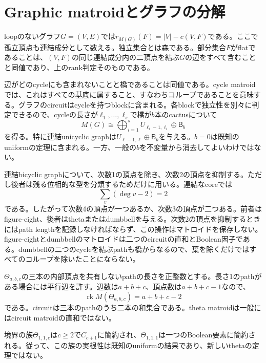 \documentclass[12pt]{amsart}
\theoremstyle{definition}
\theoremstyle{remark}
\numberwithin{equation}{section}
\newcommand{\rk}{\operatorname{rk}}
\newcommand{\Bmat}{\mathsf{B}}
\begin{document}
\section{Graphic matroidとグラフの分解}
loopのないグラフ$G=(V,E)$では$r_{M(G)}(F)=|V|-c(V,F)$である。ここで孤立頂点も連結成分として数える。独立集合とは森である。部分集合$F$がflatであることは、$(V,F)$の同じ連結成分内の二頂点を結ぶ$G$の辺をすべて含むことと同値であり、上のrank判定そのものである。

辺がどのcycleにも含まれないことと橋であることは同値である。cycle matroidでは、これはすべての基底に属すること、すなわちコループであることを意味する。グラフのcircuitはcycleを持つblockに含まれる。各blockで独立性を別々に判定できるので、cycleの長さが$\ell_1,\ldots,\ell_s$で橋が$b$本のcactusについて
\begin{equation}\label{ja-cactus-matroid}
 M(G)\cong\bigoplus_{i=1}^sU_{\ell_i-1,\ell_i}\oplus\Bmat_b
\end{equation}
を得る。特に連結unicyclic graphは$U_{\ell-1,\ell}\oplus\Bmat_b$を与える。$b=0$は既知のuniformの定理に含まれる。一方、一般の$b$を不変量から消去してよいわけではない。

連結bicyclic graphについて、次数1の頂点を除き、次数2の頂点を抑制する。ただし後者は残る位相的な型を分類するためだけに用いる。連結なcoreでは
\[
 \sum_v(\deg v-2)=2
\]
である。したがって次数4の頂点が一つあるか、次数3の頂点が二つある。前者はfigure-eight、後者はthetaまたはdumbbellを与える。次数2の頂点を抑制するときにはpath lengthを記録しなければならず、この操作はマトロイドを保存しない。figure-eightとdumbbellのマトロイドは二つのcircuitの直和とBoolean因子である。dumbbellの二つのcycleを結ぶpathも橋からなるので、葉を除くだけではすべてのコループを除いたことにならない。

$\Theta_{a,b,c}$の三本の内部頂点を共有しないpathの長さを正整数とする。長さ1のpathがある場合には平行辺を許す。辺数は$a+b+c$、頂点数は$a+b+c-1$なので、
\[
 \rk M(\Theta_{a,b,c})=a+b+c-2
\]
である。circuitは三本のpathのうち二本の和集合である。theta matroidは一般にはcircuit matroidの直和ではない。

境界の族$\Theta_{1,1,c}$は$c\geq2$で$C_{c+1}$に簡約され、$\Theta_{1,1,1}$は一つのBoolean要素に簡約される。従って、この族の実根性は既知のuniformの結果であり、新しいthetaの定理ではない。
\end{document}
